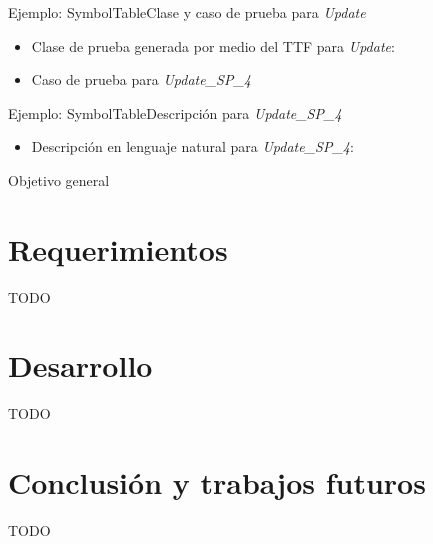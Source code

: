 \documentclass{beamer}
\begin{document}
\begin{frame}{Ejemplo: SymbolTable}{Clase y caso de prueba para \emph{Update}}

    \begin{itemize}
        \item{
                Clase de prueba generada por medio del TTF para \emph{Update}:
            }

        \item{
                Caso de prueba para \emph{Update\_SP\_4}
            }
    \end{itemize}

\end{frame}

\begin{frame}{Ejemplo: SymbolTable}{Descripción para \emph{Update\_SP\_4}}

    \begin{itemize}
        \item{
                Descripción en lenguaje natural para \emph{Update\_SP\_4}:
            }
    \end{itemize}

\end{frame}

\begin{frame}{Objetivo general}{}
\end{frame}

\section{Requerimientos}
\begin{frame}{TODO}{}

\end{frame}

\section{Desarrollo}
\begin{frame}{TODO}{}

\end{frame}

\section{Conclusión y trabajos futuros}
\begin{frame}{TODO}{}

\end{frame}
\end{document}
